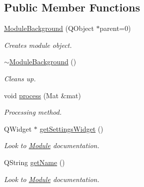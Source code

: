\subsection*{Public Member Functions}
\begin{DoxyCompactItemize}
\item 
\hyperlink{class_module_background_af258face1b277c15e48a3882f87706d2}{ModuleBackground} (QObject $\ast$parent=0)
\begin{DoxyCompactList}\small\item\em Creates module object. \item\end{DoxyCompactList}\item 
\hypertarget{class_module_background_a6c7dc7bdbbc57b84fb00a9deadd81823}{
\hyperlink{class_module_background_a6c7dc7bdbbc57b84fb00a9deadd81823}{$\sim$ModuleBackground} ()}
\label{d0/deb/class_module_background_a6c7dc7bdbbc57b84fb00a9deadd81823}

\begin{DoxyCompactList}\small\item\em Cleans up. \item\end{DoxyCompactList}\item 
void \hyperlink{class_module_background_a16547fefc230a1cbfdde67f0b09840da}{process} (Mat \&mat)
\begin{DoxyCompactList}\small\item\em Processing method. \item\end{DoxyCompactList}\item 
\hypertarget{class_module_background_a752da9035e52eb6306aed6da553697a4}{
QWidget $\ast$ \hyperlink{class_module_background_a752da9035e52eb6306aed6da553697a4}{getSettingsWidget} ()}
\label{d0/deb/class_module_background_a752da9035e52eb6306aed6da553697a4}

\begin{DoxyCompactList}\small\item\em Look to \hyperlink{class_module}{Module} documentation. \item\end{DoxyCompactList}\item 
\hypertarget{class_module_background_a909cd371484ceb4842c0359b2c25915f}{
QString \hyperlink{class_module_background_a909cd371484ceb4842c0359b2c25915f}{getName} ()}
\label{d0/deb/class_module_background_a909cd371484ceb4842c0359b2c25915f}

\begin{DoxyCompactList}\small\item\em Look to \hyperlink{class_module}{Module} documentation. \item\end{DoxyCompactList}\end{DoxyCompactItemize}


